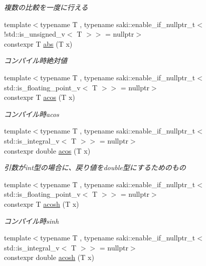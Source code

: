 \begin{DoxyCompactItemize}
\begin{DoxyCompactList}\small\item\em 複数の比較を一度に行える \end{DoxyCompactList}\item 
{\footnotesize template$<$typename T , typename saki\+::enable\+\_\+if\+\_\+nullptr\+\_\+t$<$!std\+::is\+\_\+unsigned\+\_\+v$<$ T $>$$>$  = nullptr$>$ }\\constexpr T \mbox{\hyperlink{namespacesaki_a37cd607ad87b208aa6105b5d8287dc9e}{abs}} (T x)
\begin{DoxyCompactList}\small\item\em コンパイル時絶対値 \end{DoxyCompactList}\item 
{\footnotesize template$<$typename T , typename saki\+::enable\+\_\+if\+\_\+nullptr\+\_\+t$<$ std\+::is\+\_\+floating\+\_\+point\+\_\+v$<$ T $>$$>$  = nullptr$>$ }\\constexpr T \mbox{\hyperlink{namespacesaki_a3189b75c5c7ecbf6d2204142da5fa813}{acos}} (T x)
\begin{DoxyCompactList}\small\item\em コンパイル時acos \end{DoxyCompactList}\item 
{\footnotesize template$<$typename T , typename saki\+::enable\+\_\+if\+\_\+nullptr\+\_\+t$<$ std\+::is\+\_\+integral\+\_\+v$<$ T $>$$>$  = nullptr$>$ }\\constexpr double \mbox{\hyperlink{namespacesaki_a2cad65bf92f361b4b564268af96a7844}{acos}} (T x)
\begin{DoxyCompactList}\small\item\em 引数がint型の場合に、戻り値をdouble型にするためのもの \end{DoxyCompactList}\item 
{\footnotesize template$<$typename T , typename saki\+::enable\+\_\+if\+\_\+nullptr\+\_\+t$<$ std\+::is\+\_\+floating\+\_\+point\+\_\+v$<$ T $>$$>$  = nullptr$>$ }\\constexpr T \mbox{\hyperlink{namespacesaki_ac1c85a4defc25dc9eb6b380f29946f83}{acosh}} (T x)
\begin{DoxyCompactList}\small\item\em コンパイル時sinh \end{DoxyCompactList}\item 
{\footnotesize template$<$typename T , typename saki\+::enable\+\_\+if\+\_\+nullptr\+\_\+t$<$ std\+::is\+\_\+integral\+\_\+v$<$ T $>$$>$  = nullptr$>$ }\\constexpr double \mbox{\hyperlink{namespacesaki_a8d3766d425082661e966b04504b90002}{acosh}} (T x)

\end{DoxyCompactItemize}
